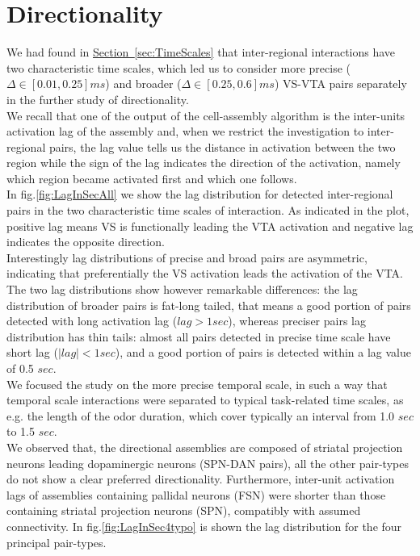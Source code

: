 \section{Directionality} 
\label{sec:Directionality}
We had found in \hyperref[sec:TimeScales]{Section~\ref*{sec:TimeScales}} that inter-regional interactions have two characteristic time scales, which led us to consider more precise ($\Delta \in [0.01,0.25] ms$) and broader ($\Delta \in [0.25,0.6] ms$) VS-VTA pairs separately in the further study of directionality.\\We recall that one of the output of the cell-assembly algorithm is the inter-units activation lag of the assembly and, when we restrict the investigation to inter-regional pairs, the lag value tells us the distance in activation between the two region while the sign of the lag indicates the direction of the activation, namely which region became activated first and which one follows.\\
In fig.\ref{fig:LagInSecAll} we show the lag distribution for detected inter-regional pairs in the two characteristic time scales of interaction. As indicated in the plot, positive lag means VS is functionally leading the VTA activation and negative lag indicates the opposite direction.\\Interestingly lag distributions of precise and broad pairs are asymmetric, indicating that preferentially the VS activation leads the activation of the VTA. The two lag distributions show however remarkable differences: the lag distribution of broader pairs is fat-long tailed, that means a good portion of pairs detected with long activation lag ($lag > 1 sec$), whereas preciser pairs lag distribution has thin tails: almost all pairs detected in precise time scale have short lag ($|lag| < 1 sec$), and a good portion of pairs is detected within a lag value of 0.5 $sec$.\\
We focused the study on the more precise temporal scale, in such a way that temporal scale interactions were separated to typical task-related time scales, as e.g. the length of the odor duration, which cover typically an interval from 1.0 $sec$ to 1.5 $sec$.\\
We observed that, the directional assemblies are composed of striatal projection neurons leading dopaminergic neurons (SPN-DAN pairs), all the other pair-types do not show a clear preferred directionality. Furthermore, inter-unit activation lags of assemblies containing pallidal neurons (FSN) were shorter than those containing striatal projection neurons (SPN), compatibly with assumed connectivity. In fig.\ref{fig:LagInSec4typo} is shown the lag distribution for the four principal pair-types.\\
